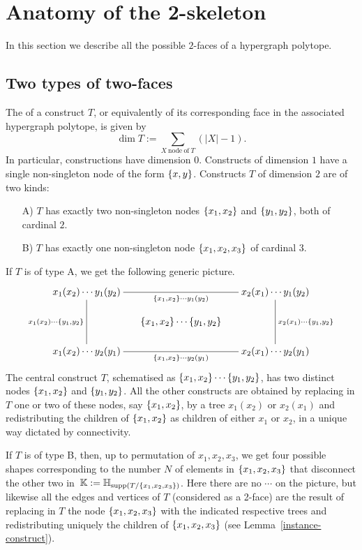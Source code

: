 
\section{Anatomy of the 2-skeleton} 
\label{s:anatomy}

In this section we describe all the possible $2$-faces of a hypergraph polytope.


\subsection{Two types of two-faces}
The  of a construct $T$, or equivalently of its corresponding face in the associated hypergraph polytope, is given by
$$\dim T :=\sum_{X\:\mathrm{node\: of}\: T}(|X|-1).$$
In particular, constructions have dimension $0$. 
Constructs of dimension $1$ have a single non-singleton node of the form $\left\{x,y\right\}$. 
Constructs $T$ of dimension $2$ are of two kinds:
\begin{itemize}
\item[A)]  $T$ has exactly two non-singleton nodes $\left\{x_1,x_2\right\}$ and $\left\{y_1,y_2\right\}$, both of cardinal $2$.
\item[B)] $T$ has exactly one non-singleton node $\left\{x_1,x_2,x_3\right\}$ of cardinal $3$.
\end{itemize}
If $T$ is of type A, we get the following generic picture.
$$ 
\xymatrix @-1.65pc { x_1(x_2)\cdots y_1(y_2) \ar @{-}[dddd]_{x_1(x_2)\cdots \set{y_1,y_2}} 
 \ar @{-}[rrrr]_{\set{x_1,x_2}\cdots y_1(y_2)} &&&& x_2(x_1)\cdots y_1(y_2) \ar @{-}[dddd]^{x_2(x_1)\cdots \set{y_1,y_2}} \\
 &&&&\\
 && \set{x_1,x_2} \cdots \set{y_1,y_2}&&\\
 &&&&\\
 x_1(x_2)\cdots y_2(y_1)  \ar @{-}[rrrr]_{\set{x_1,x_2}\cdots y_2(y_1)} &&  && x_2(x_1)\cdots y_2(y_1)}
 $$
The central construct $T$, schematised as $\left\{x_1,x_2\right\} \cdots \left\{y_1,y_2\right\}$, has two distinct nodes $\left\{x_1,x_2\right\}$ and $\left\{y_1,y_2\right\}$. 
All the other constructs are obtained by replacing in $T$ one or two of these nodes, say $\left\{x_1,x_2\right\}$, by a  tree $x_1(x_2)$ or $x_2(x_1)$ and redistributing the children of  $\left\{x_1,x_2\right\}$  as children of either $x_1$ or $x_2$, in a unique way dictated by connectivity. 

If $T$ is of type B, then, up to permutation of $x_1,x_2,x_3$, we get four possible shapes corresponding to the number $N$ of  elements in $\left\{x_1,x_2,x_3\right\}$ that disconnect the  other two in~${\mathbb K}:={\mathbb H}_{\operatorname{supp}(T/\left\{x_1,x_2,x_3\right\})}$.
Here there are no $\cdots$ on the picture, but likewise all the edges and vertices of $T$ (considered as a 2-face) are the result of replacing in $T$ the node $\left\{x_1,x_2,x_3\right\}$ with the indicated respective trees and redistributing uniquely the  children of $\left\{x_1,x_2,x_3\right\}$ (see Lemma~\ref{instance-construct}). 
 
